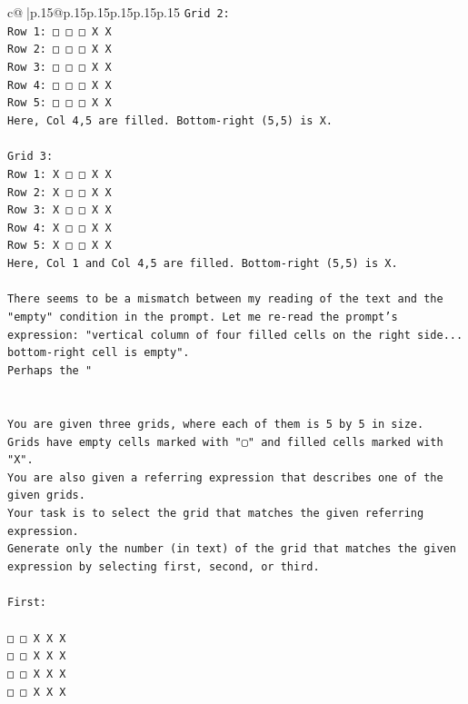 \documentclass{article}
\begin{document}
{\begin{supertabular}{c@{$\;$}|p{.15\linewidth}@{}p{.15\linewidth}p{.15\linewidth}p{.15\linewidth}p{.15\linewidth}p{.15\linewidth}}
{{{\texttt{Grid 2:} \\
\texttt{Row 1: □ □ □ X X} \\
\texttt{Row 2: □ □ □ X X} \\
\texttt{Row 3: □ □ □ X X} \\
\texttt{Row 4: □ □ □ X X} \\
\texttt{Row 5: □ □ □ X X} \\
\texttt{Here, Col 4,5 are filled. Bottom{-}right (5,5) is X.} \\
\\ 
\texttt{Grid 3:} \\
\texttt{Row 1: X □ □ X X} \\
\texttt{Row 2: X □ □ X X} \\
\texttt{Row 3: X □ □ X X} \\
\texttt{Row 4: X □ □ X X} \\
\texttt{Row 5: X □ □ X X} \\
\texttt{Here, Col 1 and Col 4,5 are filled. Bottom{-}right (5,5) is X.} \\
\\ 
\texttt{There seems to be a mismatch between my reading of the text and the "empty" condition in the prompt. Let me re{-}read the prompt's expression: "vertical column of four filled cells on the right side... bottom{-}right cell is empty".} \\
\texttt{Perhaps the "} \\
\\ 
\\ 
\texttt{You are given three grids, where each of them is 5 by 5 in size.} \\
\texttt{Grids have empty cells marked with "▢" and filled cells marked with "X".} \\
\texttt{You are also given a referring expression that describes one of the given grids.} \\
\texttt{Your task is to select the grid that matches the given referring expression.} \\
\texttt{Generate only the number (in text) of the grid that matches the given expression by selecting first, second, or third.} \\
\\ 
\texttt{First:} \\
\\ 
\texttt{□ □ X X X} \\
\texttt{□ □ X X X} \\
\texttt{□ □ X X X} \\
\texttt{□ □ X X X} \\
}}}
\end{supertabular}}
\end{document}
